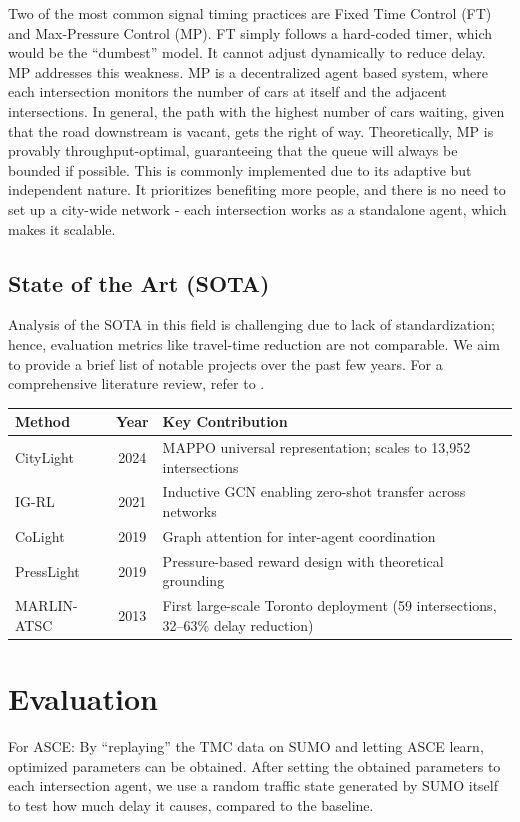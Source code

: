 \documentclass[10pt,twocolumn]{article}
\begin{document}
\vspace{0.5em}
Two of the most common signal timing practices are Fixed Time Control (FT) and Max-Pressure Control (MP). FT simply follows a hard-coded timer, which would be the “dumbest” model. It cannot adjust dynamically to reduce delay. MP addresses this weakness. MP is a decentralized agent based system, where each intersection monitors the number of cars at itself and the adjacent intersections. In general, the path with the highest number of cars waiting, given that the road downstream is vacant, gets the right of way. Theoretically, MP is provably throughput-optimal, guaranteeing that the queue will always be bounded if possible. This is commonly implemented due to its adaptive but independent nature. It prioritizes benefiting more people, and there is no need to set up a city-wide network - each intersection works as a standalone agent, which makes it scalable.

\subsection{State of the Art (SOTA)}
Analysis of the SOTA in this field is challenging due to lack of standardization; hence, evaluation metrics like travel-time reduction are not comparable. We aim to provide a brief list of notable projects over the past few years. For a comprehensive literature review, refer to \cite{michailidis_review}.

\begin{tabularx}{\columnwidth}{@{}p{} c X@{}}
\toprule
\textbf{Method} & \textbf{Year} & \textbf{Key Contribution} \\
\midrule
CityLight \cite{citylight} & 2024 & MAPPO universal representation; scales to 13,952 intersections \\
IG-RL \cite{igrl} & 2021 & Inductive GCN enabling zero-shot transfer across networks \\
CoLight \cite{colight} & 2019 & Graph attention for inter-agent coordination \\
PressLight \cite{presslight} & 2019 & Pressure-based reward design with theoretical grounding \\
MARLIN-ATSC \cite{marlin_atsc} & 2013 & First large-scale Toronto deployment (59 intersections, 32--63\% delay reduction) \\
\bottomrule
\end{tabularx}

\section{Evaluation}
For ASCE: By “replaying” the TMC data on SUMO and letting ASCE learn, optimized parameters can be obtained. After setting the obtained parameters to each intersection agent, we use a random traffic state generated by SUMO itself to test how much delay it causes, compared to the baseline.
\end{document}

